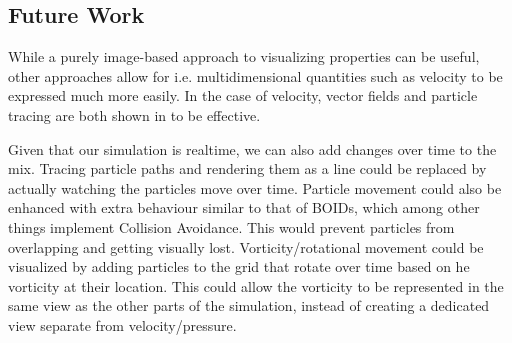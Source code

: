 \subsection{Future Work}
While a purely image-based approach to visualizing properties can be useful, other approaches allow for i.e. multidimensional quantities such as velocity to be expressed much more easily.
In the case of velocity, vector fields and particle tracing are both shown in \cite{book:griebel1998numerical} to be effective.

Given that our simulation is realtime, we can also add changes over time to the mix.
Tracing particle paths and rendering them as a line could be replaced by actually watching the particles move over time.
Particle movement could also be enhanced with extra behaviour similar to that of BOIDs\cite{BOIDS_10.1145/37401.37406}, which among other things implement Collision Avoidance.
This would prevent particles from overlapping and getting visually lost.
Vorticity/rotational movement could be visualized by adding particles to the grid that rotate over time based on he vorticity at their location.
This could allow the vorticity to be represented in the same view as the other parts of the simulation, instead of creating a dedicated view separate from velocity/pressure.